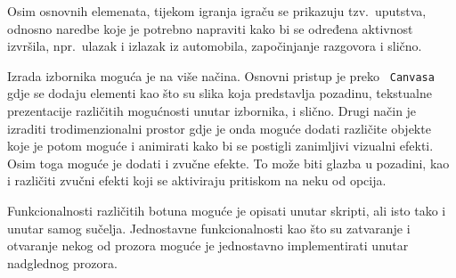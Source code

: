 Osim osnovnih elemenata, tijekom igranja igraču se prikazuju tzv.~uputstva, odnosno
naredbe koje je potrebno napraviti kako bi se određena aktivnost izvršila,
npr.~ulazak i izlazak iz automobila, započinjanje razgovora i slično.

Izrada izbornika moguća je na više načina. Osnovni pristup je preko ~\texttt{Canvasa} gdje se
dodaju elementi kao što su slika koja predstavlja pozadinu, tekstualne prezentacije
različitih mogućnosti unutar izbornika, i slično. Drugi način je izraditi
trodimenzionalni prostor gdje je onda moguće dodati različite objekte koje je potom
moguće i animirati kako bi se postigli zanimljivi vizualni efekti. Osim toga moguće
je dodati i zvučne efekte. To može biti glazba u pozadini, kao i različiti zvučni
efekti koji se aktiviraju pritiskom na neku od opcija. 

Funkcionalnosti različitih botuna moguće je opisati unutar skripti, ali isto tako i
unutar samog sučelja. Jednostavne funkcionalnosti kao što su zatvaranje i otvaranje
nekog od prozora moguće je jednostavno implementirati unutar nadglednog prozora.
